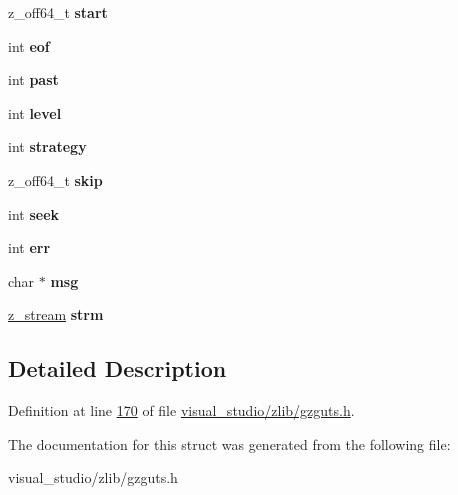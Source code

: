 \begin{DoxyCompactItemize}
\item 
\mbox{\label{structgz__state_a0eb95c1935a32c508a1e6fc1e84c8f83}} 
z\+\_\+off64\+\_\+t {\bfseries start}
\item 
\mbox{\label{structgz__state_ae50ffc823858bc4f909e3d9507356f92}} 
int {\bfseries eof}
\item 
\mbox{\label{structgz__state_a65b39b950d5cabf4c174924c922aa3ff}} 
int {\bfseries past}
\item 
\mbox{\label{structgz__state_aaf5e13a32b8618cde112e4312d480137}} 
int {\bfseries level}
\item 
\mbox{\label{structgz__state_a2777c46311012def486c2aa720fe5203}} 
int {\bfseries strategy}
\item 
\mbox{\label{structgz__state_a4bc336eac6a48fd0f2645e672e5c6c13}} 
z\+\_\+off64\+\_\+t {\bfseries skip}
\item 
\mbox{\label{structgz__state_ab60b82012b8193c3f44b2e48974b9dd9}} 
int {\bfseries seek}
\item 
\mbox{\label{structgz__state_aa9832eb9300c065f6572e5699ab27938}} 
int {\bfseries err}
\item 
\mbox{\label{structgz__state_a65d5a6b252dba3856ea3fa88623bdadb}} 
char $\ast$ {\bfseries msg}
\item 
\mbox{\label{structgz__state_a77df647f4deba86cc8a4fa0a01a08f4e}} 
\hyperlink{structz__stream__s}{z\+\_\+stream} {\bfseries strm}
\end{DoxyCompactItemize}


\subsection{Detailed Description}


Definition at line \hyperlink{visual__studio_2zlib_2gzguts_8h_source_l00170}{170} of file \hyperlink{visual__studio_2zlib_2gzguts_8h_source}{visual\+\_\+studio/zlib/gzguts.\+h}.



The documentation for this struct was generated from the following file\+:\begin{DoxyCompactItemize}
\item 
visual\+\_\+studio/zlib/gzguts.\+h\end{DoxyCompactItemize}

